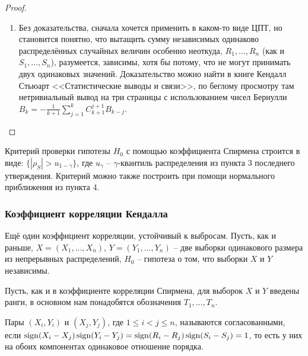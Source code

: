 \begin{proof}
\begin{enumerate}
        \item Без доказательства, сначала хочется применить в каком-то виде ЦПТ, но становится понятно, что вытащить сумму независимых одинаково распределённых случайных величин особенно неоткуда, $R_1, \dots, R_n$ (как и $S_1, \dots, S_n$), разумеется, зависимы, хотя бы потому, что не могут принимать двух одинаковых значений. Доказательство можно найти в книге Кендалл Стьюарт <<Статистические выводы и связи>>, по беглому просмотру там нетривиальный вывод на три страницы с использованием чисел Бернулли $B_k = -\frac{1}{k+1} \sum_{j=1}^k C_{k+1}^{j+1} B_{k-j}$.
    \end{enumerate}
\end{proof}

\begin{note}
    Критерий проверки гипотезы $H_0$ с помощью коэффициента Спирмена строится в виде: $\{|\rho_S| > u_{1-\gamma}\}$, где $u_\gamma$ -- $\gamma$-квантиль распределения из пункта 3 последнего утверждения. Критерий можно также построить при помощи нормального приближения из пункта 4.
\end{note}

\subsubsection{Коэффициент корреляции Кендалла}

\begin{note}
    Ещё один коэффициент корреляции, устойчивый к выбросам. Пусть, как и раньше, $X = (X_1, \dots, X_n)$, $Y = (Y_1, \dots, Y_n)$ -- две выборки одинакового размера из непрерывных распределений, $H_0$ -- гипотеза о том, что выборки $X$ и $Y$ независимы.
\end{note}

\begin{note}
    Пусть, как и в коэффициенте корреляции Спирмена, для выборок $X$ и $Y$ введены ранги, в основном нам понадобятся обозначения $T_1, \dots, T_n$.
\end{note}

\begin{definition}
    Пары $(X_i, Y_i)$ и $(X_j, Y_j)$, где $1 \le i < j \le n$, называются согласованными, если $\operatorname{sign}(X_i - X_j) \operatorname{sign}(Y_i - Y_j) = \operatorname{sign}(R_i - R_j) \operatorname{sign}(S_i - S_j) = 1$, то есть у них на обоих компонентах одинаковое отношение порядка.
\end{definition}

